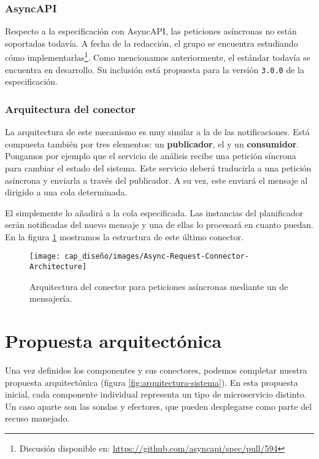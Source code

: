 \subsubsection{AsyncAPI}

Respecto a la especificación con AsyncAPI, las peticiones asíncronas no están soportadas todavía. A fecha de la redacción, el grupo se encuentra estudiando cómo implementarlas\footnote{Discusión disponible en: \url{https://github.com/asyncapi/spec/pull/594}}. Como mencionamos anteriormente, el estándar todavía se encuentra en desarrollo. Su inclusión está propuesta para la versión \texttt{3.0.0} de la especificación.

\subsubsection{Arquitectura del conector}

La arquitectura de este mecanismo es muy similar a la de las notificaciones. Está compuesta también por tres elementos: un \textbf{publicador}, el \textbf{} y un \textbf{consumidor}. Pongamos por ejemplo que el servicio de análisis recibe una petición síncrona para cambiar el estado del sistema. Este servicio deberá traducirla a una petición asíncrona y enviarla a través del publicador. A su vez, este enviará el mensaje al  dirigido a una cola determinada.

El  simplemente lo añadirá a la cola especificada. Las instancias del planificador serán notificadas del nuevo mensaje y una de ellas lo procesará en cuanto puedan. En la figura \ref{fig:async-request-connector-architecture} mostramos la estructura de este último conector.

\begin{figure}[h!]
  \centering
  \texttt{[image: cap\_diseño/images/Async-Request-Connector-Architecture]}
  \caption{Arquitectura del conector para peticiones asíncronas mediante un  de mensajería.}
  \label{fig:async-request-connector-architecture}
\end{figure}

\pagebreak

\section{Propuesta arquitectónica}

Una vez definidos los componentes y sus conectores, podemos completar nuestra propuesta arquitectónica (figura \ref{fig:arquitectura-sistema}). En esta propuesta inicial, cada componente individual representa un tipo de microservicio distinto. Un caso aparte son las sondas y efectores, que pueden desplegarse como parte del recuso manejado.

